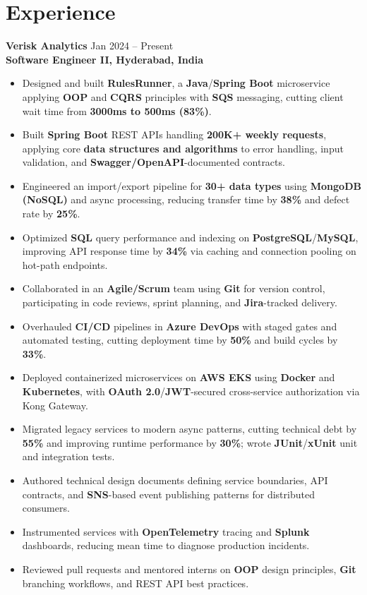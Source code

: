 \documentclass[a4paper,10pt]{article}
\begin{document}
\section*{Experience}

\textbf{Verisk Analytics} \hfill Jan 2024 -- Present \\
\textbf{Software Engineer II, Hyderabad, India}

\begin{itemize}[leftmargin=*]
    \item Designed and built \textbf{RulesRunner}, a \textbf{Java}/\textbf{Spring Boot} microservice applying \textbf{OOP} and \textbf{CQRS} principles with \textbf{SQS} messaging, cutting client wait time from \textbf{3000ms to 500ms (83\%)}.
    \item Built \textbf{Spring Boot} REST APIs handling \textbf{200K+ weekly requests}, applying core \textbf{data structures and algorithms} to error handling, input validation, and \textbf{Swagger/OpenAPI}-documented contracts.
    \item Engineered an import/export pipeline for \textbf{30+ data types} using \textbf{MongoDB (NoSQL)} and async processing, reducing transfer time by \textbf{38\%} and defect rate by \textbf{25\%}.
    \item Optimized \textbf{SQL} query performance and indexing on \textbf{PostgreSQL}/\textbf{MySQL}, improving API response time by \textbf{34\%} via caching and connection pooling on hot-path endpoints.
    \item Collaborated in an \textbf{Agile/Scrum} team using \textbf{Git} for version control, participating in code reviews, sprint planning, and \textbf{Jira}-tracked delivery.
    \item Overhauled \textbf{CI/CD} pipelines in \textbf{Azure DevOps} with staged gates and automated testing, cutting deployment time by \textbf{50\%} and build cycles by \textbf{33\%}.
    \item Deployed containerized microservices on \textbf{AWS EKS} using \textbf{Docker} and \textbf{Kubernetes}, with \textbf{OAuth 2.0}/\textbf{JWT}-secured cross-service authorization via Kong Gateway.
    \item Migrated legacy services to modern async patterns, cutting technical debt by \textbf{55\%} and improving runtime performance by \textbf{30\%}; wrote \textbf{JUnit}/\textbf{xUnit} unit and integration tests.
    \item Authored technical design documents defining service boundaries, API contracts, and \textbf{SNS}-based event publishing patterns for distributed consumers.
    \item Instrumented services with \textbf{OpenTelemetry} tracing and \textbf{Splunk} dashboards, reducing mean time to diagnose production incidents.
    \item Reviewed pull requests and mentored interns on \textbf{OOP} design principles, \textbf{Git} branching workflows, and REST API best practices.
\end{itemize}
\end{document}
